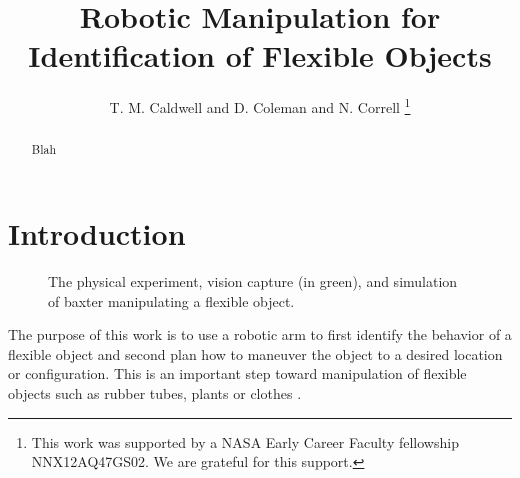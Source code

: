 \documentclass[runningheads,a4paper]{llncs}
\begin{document}
\mainmatter  %

\title{Robotic Manipulation for Identification of Flexible Objects}



\author{T. M. Caldwell and  D. Coleman and N. Correll%
\thanks{
This work was supported by a NASA
Early Career Faculty fellowship NNX12AQ47GS02. We are grateful for this support.}%
}
%


\maketitle

\begin{abstract}
Blah
\end{abstract}

\section{Introduction}

\begin{figure}[!htb]
\centering
\def\svgwidth{.95\textwidth}%

\caption{The physical experiment, vision capture (in green), and simulation of baxter manipulating a flexible object.} %
\label{fig-baxter_y}
\end{figure}

The purpose of this work is to use a robotic arm to first identify the behavior of a flexible object and second plan how to maneuver the object to a desired location or configuration. This is an important step toward manipulation of flexible objects such as rubber tubes, plants or clothes \cite{wakamatsu2006knotting,saha2007manipulation,bell2010flexible,jimenez2012survey}.  
\end{document}
